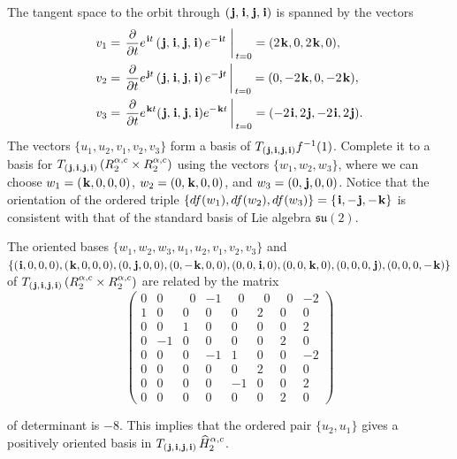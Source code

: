\documentclass[11pt,reqno]{amsart}
\theoremstyle{definition}
\renewcommand{\i}{\mspace{1.5mu}\mathbf i}
\renewcommand{\j}{\mspace{1.5mu}\mathbf j}
\renewcommand{\k}{\mspace{1.5mu}\mathbf k}
\begin{document}
\begin{sloppypar}
\smallskip\noindent
The tangent space to the orbit through $(\j, \i, \j, \i)$ is spanned by the vectors 
\[
\begin{aligned}
v_1 & = \left. \frac{\partial}{\partial t} e^{\i t}\, (\j, \i, \j, \i)\, e^{- \i t}\;  \right\vert_{\,t = 0}  = (2 \k, 0, 2 \k, 0), \\
v_2 & = \left. \frac{\partial}{\partial t} e^{\j t}\, (\j, \i, \j, \i)\, e^{- \j t}\,  \right\vert_{\,t = 0}  = (0, - 2 \k, 0, - 2 \k), \\
v_3 & = \left. \frac{\partial}{\partial t} e^{\k t} (\j, \i, \j, \i) e^{- \k t} \,  \right\vert_{\,t = 0}   = (- 2 \i, 2 \j, - 2 \i, 2 \j).
\end{aligned}
\]
The vectors $\lbrace u_1, u_2, v_1, v_2, v_3 \rbrace$ form a basis of $T_{(\j, \i, \j, \i)}f^{- 1}(1)$. Complete it to a basis for $T_{(\j, \i, \j, \i)} \left(R_2^{\alpha, c} \times R_2^{\alpha, c}\right)$ using the vectors $\lbrace w_1, w_2, w_3 \rbrace$, where we can choose $w_1 = (\k, 0, 0, 0)$, $w_2 = (0, \k, 0, 0)$, and $w_3 = (0, \j, 0, 0)$. Notice that the orientation of the ordered triple $\lbrace df(w_1), df(w_2), df(w_3) \rbrace = \lbrace \i, - \j, - \k \rbrace$ is consistent with that of the standard basis of Lie algebra $\mathfrak{su}(2)$. 

The oriented bases $\lbrace w_1, w_2, w_3, u_1, u_2, v_1, v_2, v_3 \rbrace$ and $\{ (\i, 0, 0, 0), (\k, 0, 0, 0), (0, \j, 0, 0), \allowbreak (0, - \k, 0, 0), (0, 0, \i, 0), (0, 0, \k, 0), (0, 0, 0, \j), (0, 0, 0, - \k)\}$ of $T_{(\j, \i, \j, \i)} \left(R_2^{\alpha, c} \times R_2^{\alpha, c}\right)$ are related by the matrix
\[
\left(
\begin{array}{rrrrrrrr}
0 & 0 & \;\; 0 & - 1 & \;\; 0 & \;\; 0  & \;\; 0 & - 2 \\
1 & 0 & 0 & 0 & 0 & 2 & 0 & 0 \\
0 & 0 & 1 & 0 & 0 & 0 & 0 & 2 \\
0 & - 1 & 0 & 0 & 0 & 0 & 2 & 0 \\
0 & 0 & 0 & - 1 & 1 & 0 & 0 & - 2 \\
0 & 0 & 0 & 0 & 0 & 2 & 0 & 0 \\
0 & 0 & 0 & 0 & - 1 & 0 & 0 & 2 \\
0 & 0 & 0 & 0 & 0 & 0 & 2 & 0
\end{array}
\right)
\]

\medskip\noindent
of determinant is $- 8$. This implies that the ordered pair $\lbrace u_2, u_1 \rbrace$ gives a positively oriented basis in $T_{(\j, \i, \j, \i)}\, \widehat{H}_2^{\alpha, c}$. 


\end{sloppypar}
\end{document}
